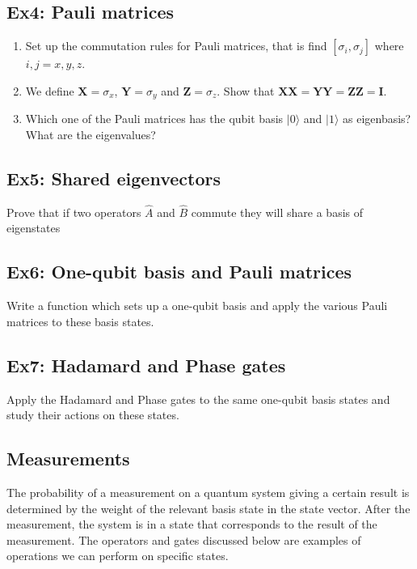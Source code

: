 \subsection{Ex4: Pauli matrices}
\begin{enumerate}
\item Set up the commutation rules for Pauli matrices, that is find $[\sigma_i,\sigma_j]$ where $i,j=x,y,z$.

\item We define $\bm{X}=\sigma_x$, $\bm{Y}=\sigma_y$ and $\bm{Z}=\sigma_z$. Show that $\bm{XX}=\bm{YY}=\bm{ZZ}=\bm{I}$.

\item Which one of the Pauli matrices has the qubit basis $\vert 0\rangle$ and $\vert 1\rangle$ as eigenbasis? What are the eigenvalues?
\end{enumerate}

\noindent
\subsection{Ex5: Shared eigenvectors}

Prove that if two operators $\hat{A}$ and $\hat{B}$ commute they will share a basis of eigenstates

\subsection{Ex6: One-qubit basis and  Pauli matrices}

Write a function which sets up a one-qubit basis and apply the various Pauli matrices to these basis states.

\subsection{Ex7: Hadamard and Phase gates}

Apply the Hadamard and Phase gates to the same one-qubit basis states and study their actions on these states.


\subsection{Measurements}

The probability of a measurement on a quantum system giving a certain
result is determined by the weight of the relevant basis state in the
state vector. After the measurement, the system is in a state that
corresponds to the result of the measurement. The operators and
gates discussed below are examples of operations we can perform on
specific states.

